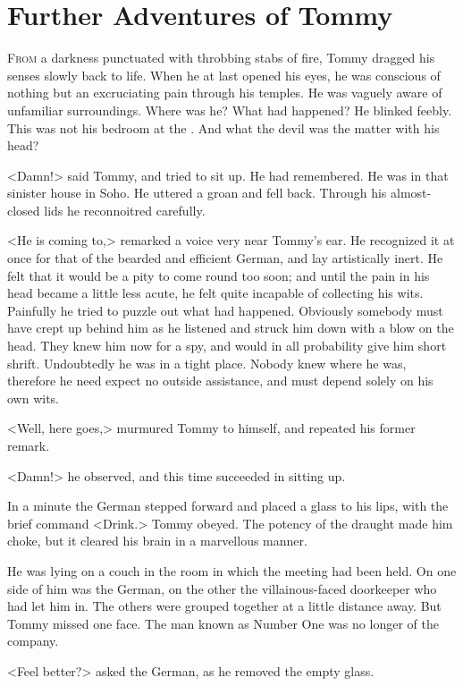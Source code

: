 \chapter{Further Adventures of Tommy} 

 \lettrine{F}{rom} a darkness punctuated with throbbing stabs of fire, Tommy dragged his senses slowly back to life. When he at last opened his eyes, he was conscious of nothing but an excruciating pain through his temples. He was vaguely aware of unfamiliar surroundings. Where was he? What had happened? He blinked feebly. This was not his bedroom at the . And what the devil was the matter with his head?

<Damn!> said Tommy, and tried to sit up. He had remembered. He was in that sinister house in Soho. He uttered a groan and fell back. Through his almost-closed lids he reconnoitred carefully.

<He is coming to,> remarked a voice very near Tommy's ear. He recognized it at once for that of the bearded and efficient German, and lay artistically inert. He felt that it would be a pity to come round too soon; and until the pain in his head became a little less acute, he felt quite incapable of collecting his wits. Painfully he tried to puzzle out what had happened. Obviously somebody must have crept up behind him as he listened and struck him down with a blow on the head. They knew him now for a spy, and would in all probability give him short shrift. Undoubtedly he was in a tight place. Nobody knew where he was, therefore he need expect no outside assistance, and must depend solely on his own wits.

<Well, here goes,> murmured Tommy to himself, and repeated his former remark.

<Damn!> he observed, and this time succeeded in sitting up.

In a minute the German stepped forward and placed a glass to his lips, with the brief command <Drink.> Tommy obeyed. The potency of the draught made him choke, but it cleared his brain in a marvellous manner.

He was lying on a couch in the room in which the meeting had been held. On one side of him was the German, on the other the villainous-faced doorkeeper who had let him in. The others were grouped together at a little distance away. But Tommy missed one face. The man known as Number One was no longer of the company.

<Feel better?> asked the German, as he removed the empty glass.

